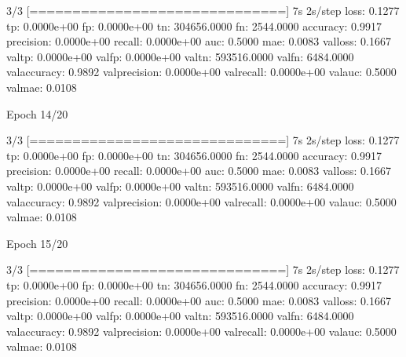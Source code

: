 \documentclass[letterpaper,10pt,english]{sphinxmanual}
\begin{document}
\begin{sphinxVerbatim}[commandchars=\\\{\}]
3/3 [==============================] \PYGZhy{} 7s 2s/step \PYGZhy{} loss: 0.1277 \PYGZhy{} tp: 0.0000e+00 \PYGZhy{} fp: 0.0000e+00 \PYGZhy{} tn: 304656.0000 \PYGZhy{} fn: 2544.0000 \PYGZhy{} accuracy: 0.9917 \PYGZhy{} precision: 0.0000e+00 \PYGZhy{} recall: 0.0000e+00 \PYGZhy{} auc: 0.5000 \PYGZhy{} mae: 0.0083 \PYGZhy{} val\PYGZus{}loss: 0.1667 \PYGZhy{} val\PYGZus{}tp: 0.0000e+00 \PYGZhy{} val\PYGZus{}fp: 0.0000e+00 \PYGZhy{} val\PYGZus{}tn: 593516.0000 \PYGZhy{} val\PYGZus{}fn: 6484.0000 \PYGZhy{} val\PYGZus{}accuracy: 0.9892 \PYGZhy{} val\PYGZus{}precision: 0.0000e+00 \PYGZhy{} val\PYGZus{}recall: 0.0000e+00 \PYGZhy{} val\PYGZus{}auc: 0.5000 \PYGZhy{} val\PYGZus{}mae: 0.0108
\end{sphinxVerbatim}

\begin{sphinxVerbatim}[commandchars=\\\{\}]
Epoch 14/20
\end{sphinxVerbatim}

\begin{sphinxVerbatim}[commandchars=\\\{\}]
3/3 [==============================] \PYGZhy{} 7s 2s/step \PYGZhy{} loss: 0.1277 \PYGZhy{} tp: 0.0000e+00 \PYGZhy{} fp: 0.0000e+00 \PYGZhy{} tn: 304656.0000 \PYGZhy{} fn: 2544.0000 \PYGZhy{} accuracy: 0.9917 \PYGZhy{} precision: 0.0000e+00 \PYGZhy{} recall: 0.0000e+00 \PYGZhy{} auc: 0.5000 \PYGZhy{} mae: 0.0083 \PYGZhy{} val\PYGZus{}loss: 0.1667 \PYGZhy{} val\PYGZus{}tp: 0.0000e+00 \PYGZhy{} val\PYGZus{}fp: 0.0000e+00 \PYGZhy{} val\PYGZus{}tn: 593516.0000 \PYGZhy{} val\PYGZus{}fn: 6484.0000 \PYGZhy{} val\PYGZus{}accuracy: 0.9892 \PYGZhy{} val\PYGZus{}precision: 0.0000e+00 \PYGZhy{} val\PYGZus{}recall: 0.0000e+00 \PYGZhy{} val\PYGZus{}auc: 0.5000 \PYGZhy{} val\PYGZus{}mae: 0.0108
\end{sphinxVerbatim}

\begin{sphinxVerbatim}[commandchars=\\\{\}]
Epoch 15/20
\end{sphinxVerbatim}

\begin{sphinxVerbatim}[commandchars=\\\{\}]
3/3 [==============================] \PYGZhy{} 7s 2s/step \PYGZhy{} loss: 0.1277 \PYGZhy{} tp: 0.0000e+00 \PYGZhy{} fp: 0.0000e+00 \PYGZhy{} tn: 304656.0000 \PYGZhy{} fn: 2544.0000 \PYGZhy{} accuracy: 0.9917 \PYGZhy{} precision: 0.0000e+00 \PYGZhy{} recall: 0.0000e+00 \PYGZhy{} auc: 0.5000 \PYGZhy{} mae: 0.0083 \PYGZhy{} val\PYGZus{}loss: 0.1667 \PYGZhy{} val\PYGZus{}tp: 0.0000e+00 \PYGZhy{} val\PYGZus{}fp: 0.0000e+00 \PYGZhy{} val\PYGZus{}tn: 593516.0000 \PYGZhy{} val\PYGZus{}fn: 6484.0000 \PYGZhy{} val\PYGZus{}accuracy: 0.9892 \PYGZhy{} val\PYGZus{}precision: 0.0000e+00 \PYGZhy{} val\PYGZus{}recall: 0.0000e+00 \PYGZhy{} val\PYGZus{}auc: 0.5000 \PYGZhy{} val\PYGZus{}mae: 0.0108
\end{sphinxVerbatim}
\end{document}
